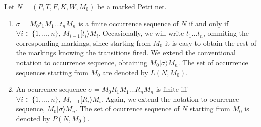 \begin{definition} Let $N=(P,T,F,K,W,M_0)$ be a marked Petri net.
\begin{enumerate}
\item $\sigma = M_0 t_1 M_1 \ldots t_n M_n$ is a finite occurrence sequence of $N$
if and only if $\forall i \in \{1,\ldots,n\},\,M_{i-1} [ t_i \rangle M_i$.
Occasionally, we will write $t_1 \ldots t_n$, ommiting the corresponding markings, since starting from
$M_0$ it is easy to obtain the rest of the markings knowing the transitions fired.
We extend the conventional notation to occurrence sequence, 
obtaining $M_0 [ \sigma \rangle M_n$.
The set of occurrence sequences starting from $M_0$ are denoted by $L(N,M_0)$.

\item An ocurrence sequence $\sigma = M_0 R_1 M_1 \ldots R_n M_n$ is finite
iff $\forall i \in \{1,\ldots,n\},\,M_{i-1} [ R_i \rangle M_i$.
Again, we extend the notation to ocurrence sequence, $M_0 [ \sigma \rangle M_n$.
The set of ocurrence sequence of $N$ starting from $M_0$ is denoted by $P(N,M_0)$.
\end{enumerate}
\end{definition}



%
%
%

